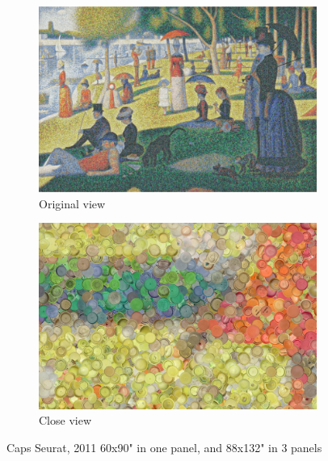 \begin{figure}[h!]
\centering
\begin{subfigure}{.47\textwidth}
  \centering
  \includegraphics[width=\linewidth]{graphics/ChrisJordan_Numbers_OriginalView.jpg}
  \caption{Original view}
  \label{fig:ChrisJordan_Numbers_CloseView}
\end{subfigure}
\hfill
\begin{subfigure}{.47\textwidth}
  \centering
  \includegraphics[width=\linewidth]{graphics/ChrisJordan_Numbers_CloseView.jpg}
  \caption{Close view}
  \label{fig:ChrisJordan_Numbers_OriginalView}
\end{subfigure}
\caption{Caps Seurat, 2011 60x90" in one panel, and 88x132" in 3 panels}
\label{fig:ChrisJordan_Numbers_CapsSeurat}
\end{figure}

